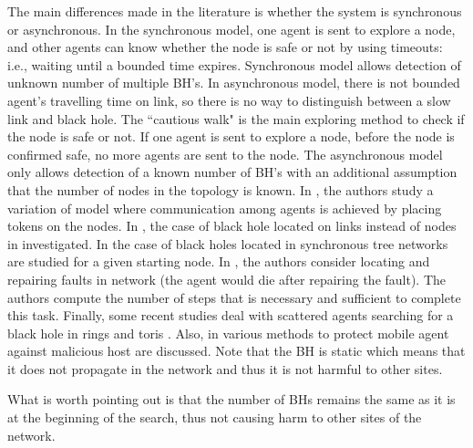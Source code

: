 The main differences made in the literature is  whether the system is synchronous or asynchronous. In the synchronous model, one agent is sent to explore a node, and other agents can know whether the node is safe or not by using timeouts: i.e., waiting until a bounded time  expires. Synchronous model allows detection of unknown number of multiple BH's. In asynchronous model, there is not bounded agent's travelling time on link, so there is no way to distinguish between a slow link and black hole. The ``cautious walk" is the main exploring method to check if the node is safe or not. If one agent is sent to explore   a node, before the node is confirmed safe, no more agents are sent to the node. The asynchronous model only allows detection of a known number of BH's with an additional assumption that the number of nodes in the topology is known. In \cite{dobr,dobr1,shi}, the authors study a variation of model where communication among agents is achieved by placing tokens on the nodes. In \cite{chal2}, the case of black hole located on links instead of nodes in investigated.
%
 In \cite{Czyz2} the case of black holes located in   synchronous tree networks are studied for a given starting node.
 In \cite{coop1}, the authors consider locating  and repairing faults in network (the agent would die after repairing the fault). The authors compute   the number of steps that is necessary and sufficient to complete this task. Finally, some recent studies deal with scattered agents searching for a black hole in rings and toris \cite{chal,chal1}. Also, in \cite{ng,hohl1,hohl2,rubi}   various methods to protect mobile agent against malicious host are discussed. Note that the BH is static which means that it does not propagate in the network and thus it is not harmful to other sites. 


What is worth pointing out is that the number of BHs remains the same as it is at the beginning of the search,   thus not causing harm to other sites of the network.
 
